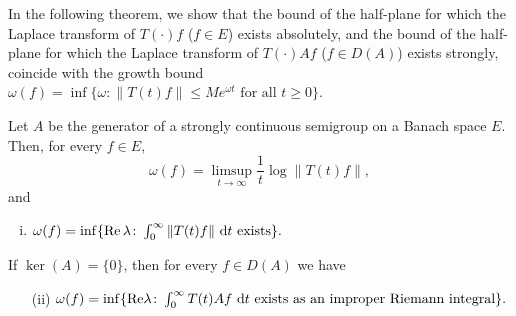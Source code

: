 

In the following theorem, we show that the bound of the half-plane for which the Laplace transform of $T(\cdot)f$ ($f \in E$) exists absolutely, and the bound of the half-plane for which the Laplace transform of $T(\cdot)Af$ ($f \in D(A)$) exists strongly, coincide with the growth bound $\omega(f) = \inf\{\omega\colon\|T(t)f\| \leq Me^{\omega t} \text{ for all } t \geq 0\}$.


\begin{theorem}\label{thm:a4-1.3}
Let $A$ be the generator of a strongly continuous semigroup on a Banach space $E$. 
Then, for every $f \in E$,
\begin{equation}\label{eq:a4-1.2}
\omega(f) = \limsup_{t \to \infty} \frac{1}{t}\log\|T(t)f\|,
\end{equation}
and
\begin{enumerate}[(i)]
\item $\omega(f) = \inf\{\mathop{}\!\mathrm{Re}\,\lambda\colon\int_{0}^{\infty} \|T(t)f\| \,\mathop{}\!\mathrm{d}{t} \text{ exists}\}.$
\end{enumerate}
If $\ker(A) = \{0\}$, then for every $f \in D(A)$ we have 
\begin{enumerate}
\item[(ii)] $\omega(f) = \inf\{\mathop{}\!\mathrm{Re}\lambda\colon\int_{0}^{\infty} T(t)Af \,\mathop{}\!\mathrm{d}{t} \text{ exists as an improper Riemann integral}\}.$
\end{enumerate}
\end{theorem}
